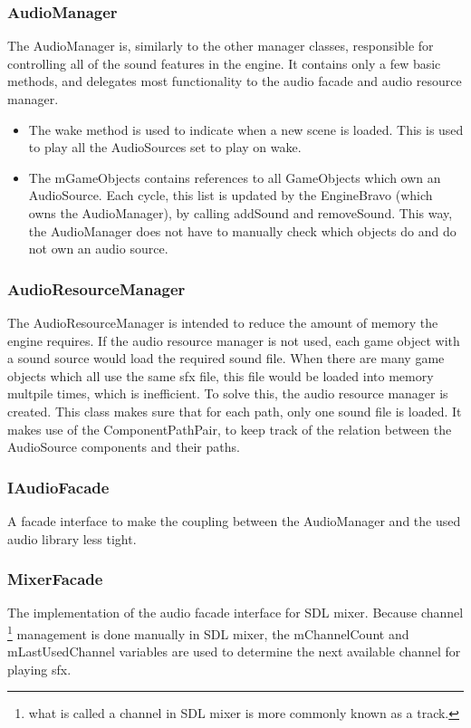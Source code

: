 \documentclass[draft]{article}
\begin{document}
\subsubsection{AudioManager}
The AudioManager is, similarly to the other manager classes, responsible for controlling all of the sound features in the engine.
It contains only a few basic methods, and delegates most functionality to the audio facade and audio resource manager.

\begin{itemize}
  \item The wake method is used to indicate when a new scene is loaded. This is used to play all the AudioSources set to play on wake.
  \item The mGameObjects contains references to all GameObjects which own an AudioSource. Each cycle, this list is updated by the EngineBravo (which owns the AudioManager), by calling addSound and removeSound. This way, the AudioManager does not have to manually check which objects do and do not own an audio source.
\end{itemize}

\subsubsection{AudioResourceManager}
The AudioResourceManager is intended to reduce the amount of memory the engine requires.
If the audio resource manager is not used, each game object with a sound source would load the required sound file.
When there are many game objects which all use the same sfx file, this file would be loaded into memory multpile times, which is inefficient.
To solve this, the audio resource manager is created. This class makes sure that for each path, only one sound file is loaded.
It makes use of the ComponentPathPair, to keep track of the relation between the AudioSource components and their paths.

\subsubsection{IAudioFacade}
A facade interface to make the coupling between the AudioManager and the used audio library less tight.

\subsubsection{MixerFacade}
The implementation of the audio facade interface for SDL mixer.
Because channel \footnote{what is called a channel in SDL mixer is more commonly known as a track.} management is done
manually in SDL mixer, the mChannelCount and mLastUsedChannel variables are used to determine the next available channel for playing sfx.
\end{document}
